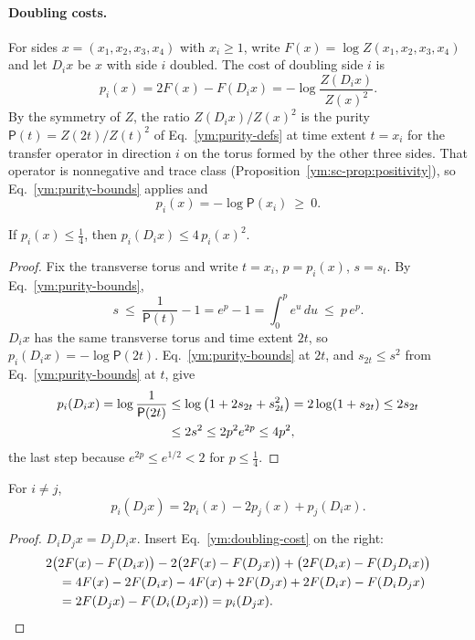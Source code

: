 \paragraph{Doubling costs.} For sides $x=(x_1,x_2,x_3,x_4)$ with
$x_i\ge1$, write $F(x)=\log Z(x_1,x_2,x_3,x_4)$ and let $D_ix$ be $x$ with
side $i$ doubled. The cost of doubling side $i$ is
\begin{equation}\label{ym:doubling-cost}
 p_i(x)=2F(x)-F(D_ix)=-\log\frac{Z(D_ix)}{Z(x)^2}.
\end{equation}
By the symmetry of $Z$, the ratio $Z(D_ix)/Z(x)^2$ is the purity
$\mathsf P(t)=Z(2t)/Z(t)^2$ of Eq.~\eqref{ym:purity-defs} at time extent
$t=x_i$ for the transfer operator in direction $i$ on the torus formed by the
other three sides. That operator is nonnegative and trace class
(Proposition~\ref{ym:sc-prop:positivity}), so Eq.~\eqref{ym:purity-bounds}
applies and
\begin{equation}\label{ym:cost-nonneg}
 p_i(x)=-\log\mathsf P(x_i)\ \ge\ 0 .
\end{equation}
\begin{lemma}\label{ym:lem:one-doubling}
If $p_i(x)\le\frac14$, then $p_i(D_ix)\le4\,p_i(x)^2$.
\end{lemma}
\begin{proof}
Fix the transverse torus and write $t=x_i$, $p=p_i(x)$, $s=s_t$. By
Eq.~\eqref{ym:purity-bounds},
\begin{equation}
 s\ \le\ \frac{1}{\mathsf P(t)}-1=e^{p}-1=\int_0^pe^u\,du\ \le\ p\,e^{p}.
\end{equation}
$D_ix$ has the same transverse torus and time extent $2t$, so
$p_i(D_ix)=-\log\mathsf P(2t)$. Eq.~\eqref{ym:purity-bounds} at $2t$, and
$s_{2t}\le s^2$ from Eq.~\eqref{ym:purity-bounds} at $t$, give
\begin{align}
 p_i(D_ix)=\log\frac{1}{\mathsf P(2t)}
 &\le\log\big(1+2s_{2t}+s_{2t}^2\big)=2\log(1+s_{2t})\le2s_{2t}\notag\\
 &\le2s^2\le2p^2e^{2p}\le4p^2,
\end{align}
the last step because $e^{2p}\le e^{1/2}<2$ for $p\le\frac14$.
\end{proof}
\begin{lemma}\label{ym:lem:commuting}
For $i\ne j$,
\begin{equation}\label{ym:commuting-doublings}
 p_i(D_jx)=2p_i(x)-2p_j(x)+p_j(D_ix).
\end{equation}
\end{lemma}
\begin{proof}
$D_iD_jx=D_jD_ix$. Insert Eq.~\eqref{ym:doubling-cost} on the right:
\begin{align}
 &2\big(2F(x)-F(D_ix)\big)-2\big(2F(x)-F(D_jx)\big)
 +\big(2F(D_ix)-F(D_jD_ix)\big)\notag\\
 &\quad=4F(x)-2F(D_ix)-4F(x)+2F(D_jx)+2F(D_ix)-F(D_iD_jx)\notag\\
 &\quad=2F(D_jx)-F(D_i(D_jx))=p_i(D_jx).
\end{align}
\end{proof}
